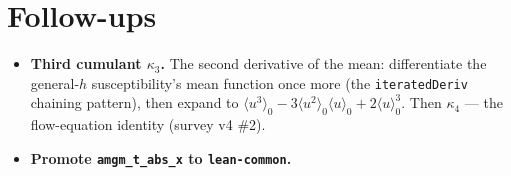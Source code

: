 \documentclass[11pt]{article}
\begin{document}
\section{Follow-ups}

\begin{itemize}[itemsep=3pt]
\item \textbf{Third cumulant $\kappa_3$.} The second derivative of the mean:
  differentiate the general-$h$ susceptibility's mean function once more (the
  \texttt{iteratedDeriv} chaining pattern), then expand to
  $\langle u^3\rangle_0-3\langle u^2\rangle_0\langle u\rangle_0+2\langle u\rangle_0^3$.
  Then $\kappa_4$ --- the flow-equation identity (survey v4 \#2).
\item \textbf{Promote \texttt{amgm\_t\_abs\_x} to \texttt{lean-common}.}
\end{itemize}
\end{document}
